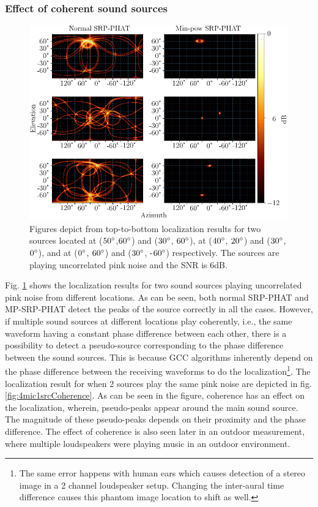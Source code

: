 \subsubsection{Effect of coherent sound sources}\label{sec:Coherent}\begin{figure}[H]
\centering
\includegraphics[width=\textwidth]{Figures/simCoherenceFalse.png}
\caption{Figures depict from top-to-bottom localization results for two sources located at ($50\degree$,$60\degree$) and ($30\degree$, $60\degree$), at ($40\degree$, $20\degree$) and ($30\degree$, $0\degree$), and at ($0\degree$, $60\degree$) and ($30\degree$, -$60\degree$) respectively. The sources are playing uncorrelated pink noise and the SNR is 6dB.}
\label{fig:4mic1srcCoherenceFalse}
\end{figure}
Fig. \ref{fig:4mic1srcCoherenceFalse} shows the localization results for two sound sources playing uncorrelated pink noise from different locations. As can be seen, both normal SRP-PHAT and MP-SRP-PHAT detect the peaks of the source correctly in all the cases. However, if multiple sound sources at different locations play coherently, i.e., the same waveform having a constant phase difference between each other, there is a possibility to detect a pseudo-source corresponding to the phase difference between the sound sources. This is because GCC algorithms inherently depend on the phase difference between the receiving waveforms to do the localization\footnote{The same error happens with human ears which causes detection of a stereo image in a 2 channel loudspeaker setup. Changing the inter-aural time difference causes this phantom image location to shift as well.}. The localization result for when 2 sources play the same pink noise are depicted in fig. \ref{fig:4mic1srcCoherence}. As can be seen in the figure, coherence has an effect on the localization, wherein, pseudo-peaks appear around the main sound source. The magnitude of these pseudo-peaks depends on their proximity and the phase difference. The effect of coherence is also seen later in an outdoor measurement, where multiple loudspeakers were playing music in an outdoor environment.
